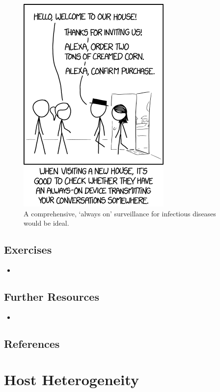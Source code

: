 \documentclass[]{book}
\theoremstyle{definition}
\theoremstyle{definition}
\theoremstyle{definition}
\theoremstyle{remark}
\begin{document}
\begin{figure}
\centering
\includegraphics{./images/xkcd-listening.png}
\caption{A comprehensive, `always on' surveillance for infectious
diseases would be ideal.}
\end{figure}

\section{Exercises}\label{exercises-9}

\begin{itemize}
\item
\end{itemize}

\section{Further Resources}\label{further-resources-9}

\begin{itemize}
\item
\end{itemize}

\section{References}\label{references-10}

\chapter{Host Heterogeneity}\label{heterogeneity}
\end{document}
